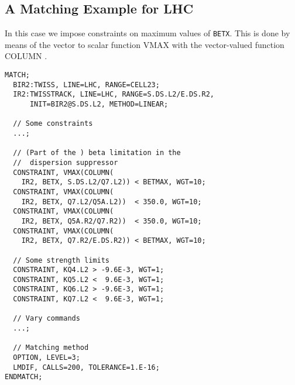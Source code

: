 \subsection{A Matching Example for LHC}
In this case we impose constraints on maximum values of \texttt{BETX}.
This is done by means of the vector to scalar function
{VMAX}  with the vector-valued function
{COLUMN} .
\begin{verbatim}
MATCH;
  BIR2:TWISS, LINE=LHC, RANGE=CELL23;
  IR2:TWISSTRACK, LINE=LHC, RANGE=S.DS.L2/E.DS.R2,
      INIT=BIR2@S.DS.L2, METHOD=LINEAR;

  // Some constraints
  ...;

  // (Part of the ) beta limitation in the
  //  dispersion suppressor
  CONSTRAINT, VMAX(COLUMN(
  	IR2, BETX, S.DS.L2/Q7.L2)) < BETMAX, WGT=10;
  CONSTRAINT, VMAX(COLUMN(
  	IR2, BETX, Q7.L2/Q5A.L2))  < 350.0, WGT=10;
  CONSTRAINT, VMAX(COLUMN(
  	IR2, BETX, Q5A.R2/Q7.R2))  < 350.0, WGT=10;
  CONSTRAINT, VMAX(COLUMN(
  	IR2, BETX, Q7.R2/E.DS.R2)) < BETMAX, WGT=10;

  // Some strength limits
  CONSTRAINT, KQ4.L2 > -9.6E-3, WGT=1;
  CONSTRAINT, KQ5.L2 <  9.6E-3, WGT=1;
  CONSTRAINT, KQ6.L2 > -9.6E-3, WGT=1;
  CONSTRAINT, KQ7.L2 <  9.6E-3, WGT=1;

  // Vary commands
  ...;

  // Matching method
  OPTION, LEVEL=3;
  LMDIF, CALLS=200, TOLERANCE=1.E-16;
ENDMATCH;
\end{verbatim}

